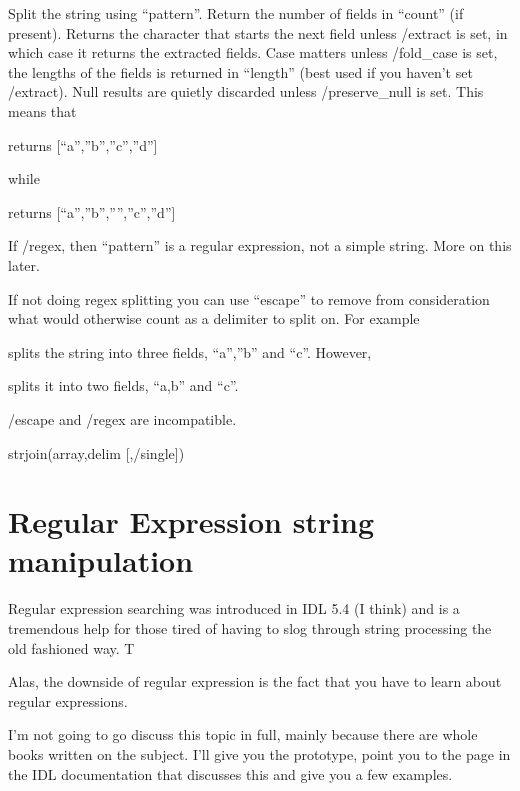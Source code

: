    Split the string using ``pattern''. Return the number of fields in
   ``count'' (if present). Returns the character that starts the next
   field unless /extract is set, in which case it returns the
   extracted fields. Case matters unless /fold\_case is set, the
   lengths of the fields is returned in ``length'' (best used if you
   haven't set /extract). Null results are quietly discarded unless
   /preserve\_null is set. This means that


   returns [``a'',''b'',''c'',''d''] 

   while


  returns [``a'',''b'','''',''c'',''d''] 

  If /regex, then ``pattern'' is a regular expression, not a simple
  string. More on this later.

  If not doing regex splitting you can use ``escape'' to remove from
  consideration what would otherwise count as a delimiter to split
  on. For example


  splits the string into three fields, ``a'',''b'' and ``c''. However,


    splits it into two fields, ``a,b'' and ``c''.

   
    /escape and /regex are incompatible.


  \item strjoin(array,delim [,/single])

\ei


\section{Regular Expression string manipulation}%

  Regular expression searching was introduced in IDL 5.4 (I think) and
  is a tremendous help for those tired of having to slog through
  string processing the old fashioned way. T

  Alas, the downside of regular expression is the fact that you have
  to learn about regular expressions.

  I'm not going to go discuss this topic in full, mainly because there
  are whole books written on the subject. I'll give you the prototype,
  point you to the page in the IDL documentation that discusses this
  and give you a few examples.


